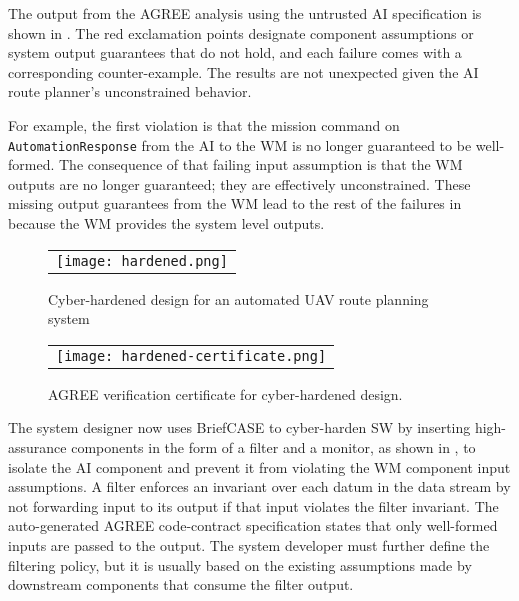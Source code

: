 The output from the AGREE analysis using the untrusted AI
specification is shown in .  The red
exclamation points designate component assumptions or system output
guarantees that do not hold, and each failure comes with a
corresponding counter-example.  The results are not unexpected given
the AI route planner's unconstrained behavior.

For example, the first violation is that the mission command on \texttt{AutomationResponse} from
the AI to the WM is no longer guaranteed to be well-formed.  The
consequence of that failing input assumption is that the WM outputs
are no longer guaranteed; they are effectively unconstrained.  These
missing output guarantees from the WM lead to the rest of the failures
in  because the WM provides the system
level outputs.

\begin{figure*}
  \begin{center}
    \begin{tabular}{c}
      \texttt{[image: hardened.png]}
    \end{tabular}
  \end{center}
  \caption{Cyber-hardened design for an automated UAV route planning system}
  \label{fig:hardened}
\end{figure*}

\begin{figure}
  \begin{center}
    \begin{tabular}{c}
      \texttt{[image: hardened-certificate.png]}
    \end{tabular}
  \end{center}
  \caption{AGREE verification certificate for cyber-hardened design.}
  \label{fig:hardened-certificate}
\end{figure}

The system designer now uses BriefCASE to cyber-harden SW by inserting
high-assurance components in the form of a filter and a monitor, as
shown in , to isolate the AI component and prevent it from violating the WM component input assumptions.
A filter enforces an invariant over
each datum in the data stream by not forwarding input to its output if
that input violates the filter invariant.  The auto-generated AGREE
code-contract specification states that only well-formed inputs are passed to the
output.  The system developer must further define the filtering
policy, but it is usually based on the existing assumptions made by
downstream components that consume the filter output.

